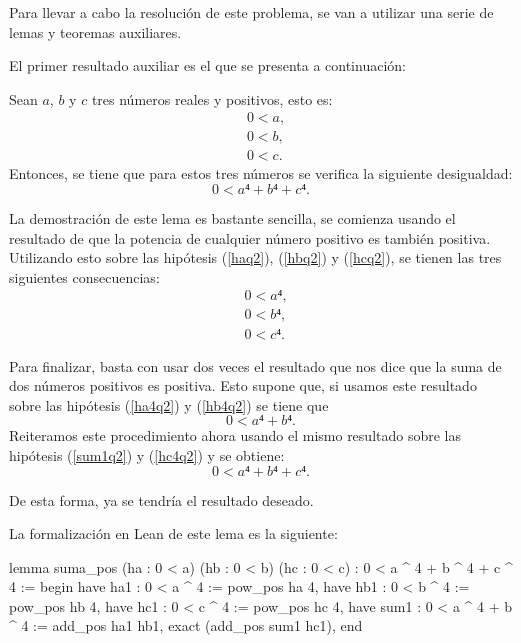 Para llevar a cabo la resolución de este problema, se van a utilizar
una serie de lemas y teoremas auxiliares.

El primer resultado auxiliar es el que se presenta a continuación:

\begin{lema}\label{lemasuma}
  Sean \(a\), \(b\) y \(c\) tres números reales y positivos, esto es:
  \begin{align}
    &0 < a, \label{haq2}\tag{ha}\\
    &0 < b, \label{hbq2}\tag{hb}\\
    &0 < c. \label{hcq2}\tag{hc}
  \end{align}
  Entonces, se tiene que para estos tres números se verifica la
  siguiente desigualdad:
  \begin{equation}
    0 < a⁴+b⁴+c⁴.
  \end{equation}
\end{lema}

\begin{demostracion}
  La demostración de este lema es bastante sencilla, se comienza usando
  el resultado de que la potencia de cualquier número positivo es
  también positiva. Utilizando esto sobre las hipótesis (\ref{haq2}),
  (\ref{hbq2}) y (\ref{hcq2}), se tienen las tres siguientes
  consecuencias:
  \begin{align}
    &0 < a⁴, \label{ha4q2}\tag{ha1}\\
    &0 < b⁴, \label{hb4q2}\tag{hb1}\\
    &0 < c⁴. \label{hc4q2}\tag{hc1}
  \end{align}

  Para finalizar, basta con usar dos veces el resultado que nos dice que
  la suma de dos números positivos es positiva. Esto supone que, si
  usamos este resultado sobre las hipótesis (\ref{ha4q2}) y
  (\ref{hb4q2}) se tiene que
  \begin{equation}\label{sum1q2}\tag{sum1}
    0 < a⁴+b⁴.
  \end{equation}
  Reiteramos este procedimiento ahora usando el mismo resultado sobre
  las hipótesis (\ref{sum1q2}) y (\ref{hc4q2}) y se obtiene:
  \begin{equation}
    0 < a⁴+b⁴+c⁴.
  \end{equation}

  De esta forma, ya se tendría el resultado deseado.
\end{demostracion}

La formalización en Lean de este lema es la siguiente:
\begin{leancode}
lemma suma_pos
  (ha : 0 < a)
  (hb : 0 < b)
  (hc : 0 < c)
  : 0 < a ^ 4 + b ^ 4 + c ^ 4 :=
begin
  have ha1 : 0 < a ^ 4          := pow_pos ha 4,
  have hb1 : 0 < b ^ 4          := pow_pos hb 4,
  have hc1 : 0 < c ^ 4          := pow_pos hc 4,
  have sum1 : 0 < a ^ 4 + b ^ 4 := add_pos ha1 hb1,
  exact (add_pos sum1 hc1),
end
\end{leancode}

